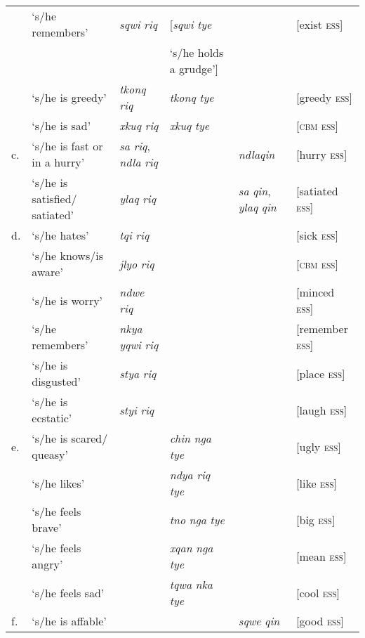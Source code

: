 \documentclass[output=paper]{langsci/langscibook}
\begin{document}
\begin{table}[t]
\begin{tabularx}{\textwidth}{l@{~} Q l@{}l@{}l l@{}}
&`s/he remembers'&\emph{sqwi} \emph{riq} &[\emph{sqwi} \emph{tye} &&[exist \textsc{ess}] \\
&&&`s/he holds a grudge']&& \\
&`s/he is greedy'&\emph{tkonq} \emph{riq} &\emph{tkonq} \emph{tye} && [greedy \textsc{ess}] \\
&`s/he is sad' &\emph{xkuq} \emph{riq} &\emph{xkuq} \emph{tye} &&[\textsc{cbm} \textsc{ess}] \\
c.&`s/he is fast or in a hurry'&\emph{sa} \emph{riq}, \emph{ndla} \emph{riq}&&\emph{ndla}\emph{qin}&[hurry \textsc{ess}] \\
&`s/he is satisfied/ satiated'&\emph{ylaq} \emph{riq}&&\emph{sa} \emph{qin}, \emph{ylaq} \emph{qin}&[satiated \textsc{ess}] \\
d.&`s/he hates'&\emph{tqi} \emph{riq} &&&[sick \textsc{ess}]  \\
&`s/he knows/is aware' &\emph{jlyo} \emph{riq} &&&[\textsc{cbm} \textsc{ess}]  \\
&`s/he is worry' &\emph{ndwe} \emph{riq} &&&[minced \textsc{ess}]  \\
&`s/he remembers'&\emph{nkya} \emph{yqwi} \emph{riq} &&&[remember \textsc{ess}]  \\
&`s/he is disgusted' &\emph{stya} \emph{riq} &&&[place \textsc{ess}]  \\
&`s/he is ecstatic'&\emph{styi} \emph{riq} &&&[laugh \textsc{ess}]  \\
e.&`s/he is scared/ queasy' &&\emph{chin} \emph{nga} \emph{tye} &&[ugly \textsc{ess}]  \\
&`s/he likes' &&\emph{ndya} \emph{riq} \emph{tye}&&[like \textsc{ess}]  \\
&`s/he feels brave' &&\emph{tno} \emph{nga} \emph{tye} &&[big \textsc{ess}]  \\
&`s/he feels angry' &&\emph{xqan} \emph{nga} \emph{tye} &&[mean \textsc{ess}]  \\
&`s/he feels sad' &&\emph{tqwa} \emph{nka} \emph{tye} &&[cool \textsc{ess}]  \\
f.&`s/he is affable' &&&\emph{sqwe} \emph{qin}&[good \textsc{ess}]  \\

\end{tabularx}
\end{table}
\end{document}
